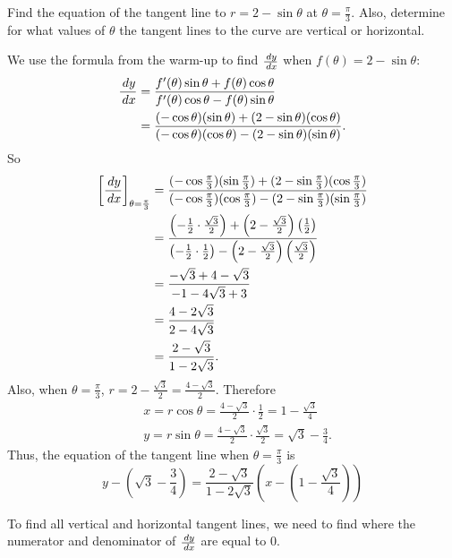 \documentclass[handout,instructornotes]{ximera}
\begin{document}
\begin{problem}
Find the equation of the tangent line to $r = 2 - \sin \theta$ at $\theta = \frac{\pi}{3}$.  
Also, determine for what values of $\theta$ the tangent lines to the curve are vertical or horizontal.
	\begin{freeResponse}
	We use the formula from the warm-up to find $\frac{\,d y}{\,d x}$ when $f(\theta) = 2 - \sin \theta$:
		\begin{align*}
		\frac{\,d y}{\,d x}
		&= \frac{f'(\theta) \sin \theta + f(\theta) \cos \theta}{f'(\theta) \cos \theta - f(\theta) \sin \theta } \\
		&= \frac{(- \cos \theta)(\sin \theta) + (2 - \sin \theta)(\cos \theta)}{(-\cos \theta)(\cos \theta) - (2 - \sin \theta)(\sin \theta)}.
		\end{align*}
	So
		\begin{align*}
		\bigg[ \frac{\,d y}{\,d x} \bigg]_{\theta = \frac{\pi}{3}} 
		&= \frac{(- \cos \frac{\pi}{3})(\sin \frac{\pi}{3}) + (2 - \sin \frac{\pi}{3})(\cos \frac{\pi}{3})}{(-\cos \frac{\pi}{3})(\cos \frac{\pi}{3}) - (2 - \sin \frac{\pi}{3})(\sin \frac{\pi}{3})}  \\
		&= \frac{\left( - \frac{1}{2} \cdot \frac{\sqrt{3}}{2} \right) + \left( 2 - \frac{\sqrt{3}}{2} \right) \left( \frac{1}{2} \right)}{\left( - \frac{1}{2} \cdot \frac{1}{2} \right) - \left( 2 - \frac{\sqrt{3}}{2} \right) \left( \frac{\sqrt{3}}{2} \right)}  \\
		&= \frac{- \sqrt{3} + 4 - \sqrt{3}}{-1 - 4 \sqrt{3} + 3}  \\
		&= \frac{4 - 2 \sqrt{3}}{2 - 4 \sqrt{3}}  \\
		&= \frac{2 - \sqrt{3}}{1 - 2 \sqrt{3}}.
		\end{align*}
	Also, when $\theta = \frac{\pi}{3}$, $r = 2 - \frac{\sqrt{3}}{2} = \frac{4 - \sqrt{3}}{2}$.  
	Therefore
		\begin{align*}
		&x = r \cos \theta = \frac{4 - \sqrt{3}}{2} \cdot \frac{1}{2} = 1 - \frac{\sqrt{3}}{4}  \\
		&y = r \sin \theta = \frac{4 - \sqrt{3}}{2} \cdot \frac{\sqrt{3}}{2} = \sqrt{3} - \frac{3}{4}.
		\end{align*}
	Thus, the equation of the tangent line when $\theta = \frac{\pi}{3}$ is
		\[
		\boxed{y - \left( \sqrt{3} - \frac{3}{4} \right) = \frac{2 - \sqrt{3}}{1 - 2 \sqrt{3}} \left( x - \left( 1 - \frac{\sqrt{3}}{4} \right) \right)}
		\]
		
	To find all vertical and horizontal tangent lines, we need to find where the numerator and denominator of $\frac{\,d y}{\,d x}$ are equal to $0$.
	

\end{freeResponse}
\end{problem}
\end{document}
